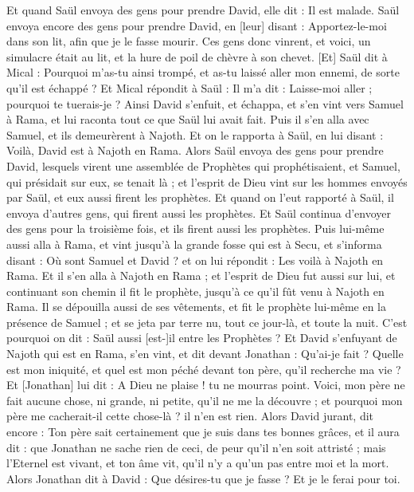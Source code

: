 \begin{multicols}{2}
Et quand Saül envoya des gens pour prendre David, elle dit : Il est malade.
Saül envoya encore des gens pour prendre David, en [leur] disant : Apportez-le-moi dans son lit, afin que je le fasse mourir.
Ces gens donc vinrent, et voici, un simulacre était au lit, et la hure de poil de chèvre à son chevet.
[Et] Saül dit à Mical : Pourquoi m'as-tu ainsi trompé, et as-tu laissé aller mon ennemi, de sorte qu'il est échappé ? Et Mical répondit à Saül : Il m'a dit : Laisse-moi aller ; pourquoi te tuerais-je ?
Ainsi David s'enfuit, et échappa, et s'en vint vers Samuel à Rama, et lui raconta tout ce que Saül lui avait fait. Puis il s'en alla avec Samuel, et ils demeurèrent à Najoth.
Et on le rapporta à Saül, en lui disant : Voilà, David est à Najoth en Rama.
Alors Saül envoya des gens pour prendre David, lesquels virent une assemblée de Prophètes qui prophétisaient, et Samuel, qui présidait sur eux, se tenait là ; et l'esprit de Dieu vint sur les hommes envoyés par Saül, et eux aussi firent les prophètes.
Et quand on l'eut rapporté à Saül, il envoya d'autres gens, qui firent aussi les prophètes. Et Saül continua d'envoyer des gens pour la troisième fois, et ils firent aussi les prophètes.
Puis lui-même aussi alla à Rama, et vint jusqu'à la grande fosse qui est à Secu, et s'informa disant : Où sont Samuel et David ? et on lui répondit : Les voilà à Najoth en Rama.
Et il s'en alla à Najoth en Rama ; et l'esprit de Dieu fut aussi sur lui, et continuant son chemin il fit le prophète, jusqu'à ce qu'il fût venu à Najoth en Rama.
Il se dépouilla aussi de ses vêtements, et fit le prophète lui-même en la présence de Samuel ; et se jeta par terre nu, tout ce jour-là, et toute la nuit. C'est pourquoi on dit : Saül aussi [est-]il entre les Prophètes ?
\VerseOne{}Et David s'enfuyant de Najoth qui est en Rama, s'en vint, et dit devant Jonathan : Qu'ai-je fait ? Quelle est mon iniquité, et quel est mon péché devant ton père, qu'il recherche ma vie ?
Et [Jonathan] lui dit : A Dieu ne plaise ! tu ne mourras point. Voici, mon père ne fait aucune chose, ni grande, ni petite, qu'il ne me la découvre ; et pourquoi mon père me cacherait-il cette chose-là ? il n'en est rien.
Alors David jurant, dit encore : Ton père sait certainement que je suis dans tes bonnes grâces, et il aura dit : que Jonathan ne sache rien de ceci, de peur qu'il n'en soit attristé ; mais l'Eternel est vivant, et ton âme vit, qu'il n'y a qu'un pas entre moi et la mort.
Alors Jonathan dit à David : Que désires-tu que je fasse ? Et je le ferai pour toi.

\end{multicols}
